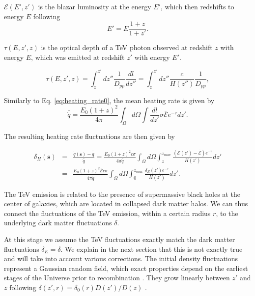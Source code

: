 \documentclass[twocolumns]{emulateapj}
\begin{document}
$\mathcal{E}(E',z')$ is  the   blazar luminosity at the energy $E'$,  which then redshifts to energy $E$ following 
\begin{equation}
  \label{eq:E_z}
  E'=E\frac{1+z}{1+z'}.
\end{equation}

$\tau(E,z',z)$ is the optical depth of a TeV photon observed at redshift $z$ with energy $E$, which was emitted at redshift $z'$ with energy $E'$.

\begin{equation}
  \label{eq:tau}
  \tau(E,z',z)=\int_z^{z'}dz''\frac{1}{D_{pp}}\frac{dl}{dz''}=\int_z^{z'}dz''\frac{c}{H(z'')}\frac{1}{D_{pp}},
\end{equation}



Similarly to Eq. \ref{eq:heating_rate0},  the mean heating rate is given by 
\begin{equation}
  \label{eq:mean_exp_heat}
  \bar{\dot{q}}=\frac{E_0(1+z)^2}{4\pi}\int_{\Omega}d\Omega\int \frac{dl}{dz'}\sigma\bar{\mathcal{E}} e^{-\tau}dz'.
\end{equation}


The resulting heating rate fluctuations are then given by

\begin{eqnarray}
  \label{eq:fluc_exp0}
  \delta_H(\mathbf{s})&=&\frac{\dot{q}(\mathbf{s})-\bar{\dot{q}}}{\bar{\dot{q}}}=\frac{E_0(1+z)^2c\sigma}{4\pi\bar{\dot{q}}} \int_{\Omega}d\Omega\int_z^{z_{max}} \frac{ ( \mathcal{E}(z')-\bar{\mathcal{E}})  e^{-\tau}}{H(z')} dz' \\ \nonumber
  &=&\frac{E_0(1+z)^2\bar{\mathcal{E}} c\sigma}{4\pi\bar{\dot{q}}}  \int_{\Omega}d\Omega\int_0^{z_{max}}   \frac{\delta_E(z')  e^{-\tau}}{H(z')}dz'.
\end{eqnarray}

The TeV emission is related to the presence of supermassive black holes at the center of galaxies, which are located in collapsed dark matter halos.  We can thus connect the fluctuations of the TeV emission, within a certain radius $r$, to the underlying dark matter fluctuations $\delta$.

At this stage we assume the TeV fluctuations exactly match the dark matter fluctuations $\delta_E=\delta$.  We explain in the next section that this is not exactly true and will take into account various corrections.  The initial density fluctuations represent a Gaussian random field, which exact properties depend on the earliest stages of the Universe prior to recombination \citep{1986ApJ...304...15B,Peebles}. They grow linearly between $z'$ and $z$ following $\delta(z',r)=\delta_0(r)D(z')/D(z)$ \citep{ 1977MNRAS.179..351H}.
\end{document}
